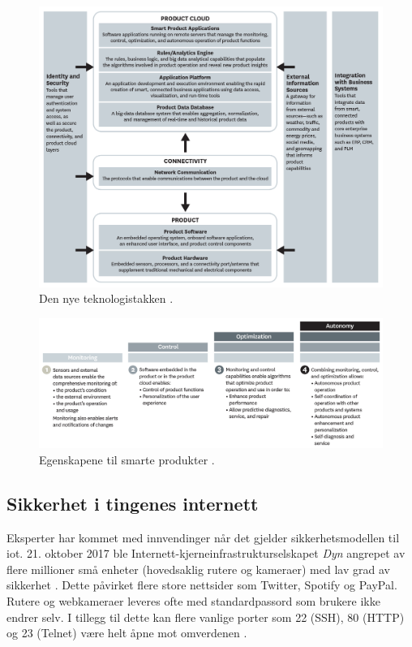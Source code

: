 \begin{figure}
\includegraphics[width=1.1\textwidth,center]{fig/harvard_technology}
\caption{Den nye teknologistakken \citep{iot_harvard_smart}.}
\label{fig:iot_harvard_smart}
\end{figure}

\begin{figure}
\includegraphics[width=1.1\textwidth,center]{fig/harvard_capabilities}
\caption{Egenskapene til smarte produkter \citep{iot_harvard_smart}.}
\label{fig:iot_harvard_capabilities}
\end{figure}


\subsection{Sikkerhet i tingenes internett}
Eksperter har kommet med innvendinger når det gjelder sikkerhetsmodellen til \gls{iot}.
21. oktober 2017 ble Internett-kjerneinfrastrukturselskapet \textit{Dyn} angrepet av flere millioner
små enheter (hovedsaklig rutere og kameraer) med lav grad av sikkerhet \citep{iot_attack_ddos}.
Dette påvirket flere store nettsider som Twitter, Spotify og PayPal. Rutere og webkameraer leveres
ofte med standardpassord som brukere ikke endrer selv. I tillegg til dette kan flere vanlige
porter som 22 (SSH), 80 (HTTP) og 23 (Telnet) være helt åpne mot omverdenen \citep{iot_mirai_botnet}.

